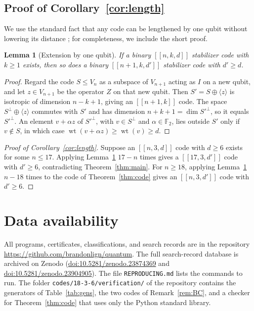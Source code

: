 \documentclass[11pt]{article}
\newtheorem{lemma}[theorem]{Lemma}
\theoremstyle{definition}
\theoremstyle{remark}
\newcommand{\F}{\mathbb F_2}
\newcommand{\qc}[1]{[\![#1]\!]}
\newcommand{\wt}{\operatorname{wt}}
\newcommand{\pathcode}[1]{{\small\nolinkurl{#1}}}
\begin{document}
\subsection{Proof of Corollary~\ref{cor:length}}

We use the standard fact that any code can be lengthened by one qubit
without lowering its distance \cite{crss}; for completeness, we include
the short proof.

\begin{lemma}[Extension by one qubit]\label{lem:pad}
If a binary \(\qc{n,k,d}\) stabilizer code with \(k\geq1\) exists, then
so does a binary \(\qc{n+1,k,d'}\) stabilizer code with \(d'\geq d\).
\end{lemma}
\begin{proof}
Regard the code \(S\leq V_n\) as a subspace of \(V_{n+1}\) acting as
\(I\) on a new qubit, and let \(z\in V_{n+1}\) be the operator \(Z\) on
that new qubit. Then \(S'=S\oplus\langle z\rangle\) is isotropic of
dimension \(n-k+1\), giving an \(\qc{n+1,k}\) code. The space
\(S^\perp\oplus\langle z\rangle\) commutes with \(S'\) and has dimension
\(n+k+1=\dim S'^\perp\), so it equals \(S'^\perp\). An element
\(v+\alpha z\) of \(S'^\perp\), with \(v\in S^\perp\) and
\(\alpha\in\F\), lies outside \(S'\) only if \(v\notin S\), in which
case \(\wt(v+\alpha z)\geq\wt(v)\geq d\).
\end{proof}

\begin{proof}[Proof of Corollary~\ref{cor:length}]
Suppose an \(\qc{n,3,d}\) code with \(d\geq6\) exists for some
\(n\leq17\). Applying Lemma~\ref{lem:pad} \(17-n\) times gives a
\(\qc{17,3,d'}\) code with \(d'\geq6\), contradicting
Theorem~\ref{thm:main}. For \(n\geq18\), applying Lemma~\ref{lem:pad}
\(n-18\) times to the code of Theorem~\ref{thm:code} gives an
\(\qc{n,3,d'}\) code with \(d'\geq6\).
\end{proof}

\section*{Data availability}
All programs, certificates, classifications, and search records are in
the repository \url{https://github.com/brandonlign/quantum}. The full
search-record database is archived on Zenodo
(\href{https://doi.org/10.5281/zenodo.23874369}{doi:10.5281/zenodo.23874369}
and \href{https://doi.org/10.5281/zenodo.23904905}{doi:10.5281/zenodo.23904905}).
The file \pathcode{REPRODUCING.md} lists the commands to run. The folder
\pathcode{codes/18-3-6/verification/} of the repository contains the
generators of Table~\ref{tab:gens}, the two codes of
Remark~\ref{rem:BC}, and a checker for Theorem~\ref{thm:code} that uses
only the Python standard library.
\end{document}
